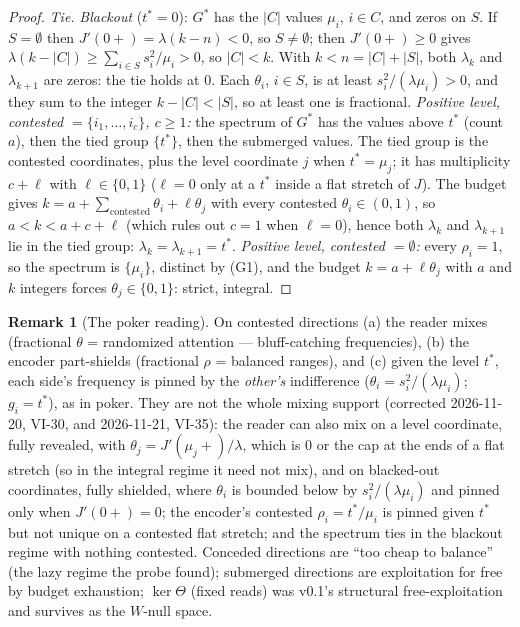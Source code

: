 \documentclass[11pt]{article}
\theoremstyle{definition}
\newtheorem{remark}{Remark}
\begin{document}
\begin{proof}
\emph{Tie.} \emph{Blackout} ($t^\ast=0$): $G^\ast$ has the $|C|$ values
$\mu_i$, $i\in C$, and zeros on $S$. If $S=\emptyset$ then
$J'(0+)=\lambda(k-n)<0$, so $S\neq\emptyset$; then
$J'(0+)\ge0$ gives $\lambda(k-|C|)\ge\sum_{i\in S}s_i^2/\mu_i>0$, so
$|C|<k$. With $k<n=|C|+|S|$, both $\lambda_k$ and $\lambda_{k+1}$ are
zeros: the tie holds at $0$. Each $\theta_i$, $i\in S$, is at least
$s_i^2/(\lambda\mu_i)>0$, and they sum to the integer $k-|C|<|S|$, so at
least one is fractional. \emph{Positive level, contested
$=\{i_1,\dots,i_c\}$, $c\ge1$:} the spectrum of $G^\ast$ has the values
above $t^\ast$ (count $a$), then the tied group $\{t^\ast\}$, then the
submerged values. The tied group is the contested coordinates, plus
the level coordinate $j$ when $t^\ast=\mu_j$; it has multiplicity
$c+\ell$ with $\ell\in\{0,1\}$ ($\ell=0$ only at a $t^\ast$ inside a
flat stretch of $J$). The budget gives $k = a +
\sum_{\text{contested}}\theta_i + \ell\theta_j$ with every contested
$\theta_i\in(0,1)$, so $a < k < a + c + \ell$ (which rules out $c=1$
when $\ell=0$), hence both $\lambda_k$ and $\lambda_{k+1}$ lie in the
tied group: $\lambda_k = \lambda_{k+1} = t^\ast$. \emph{Positive level,
contested $=\emptyset$:} every $\rho_i=1$, so the spectrum is
$\{\mu_i\}$, distinct by (G1), and the budget $k=a+\ell\theta_j$ with
$a$ and $k$ integers forces $\theta_j\in\{0,1\}$: strict, integral.
\end{proof}

\begin{remark}[The poker reading]
On contested directions (a) the reader mixes (fractional $\theta$ =
randomized attention --- bluff-catching frequencies), (b) the encoder
part-shields (fractional $\rho$ = balanced ranges), and (c) given the
level $t^\ast$, each side's frequency is pinned by the \emph{other's}
indifference
($\theta_i = s_i^2/(\lambda\mu_i)$; $g_i = t^\ast$), as in poker. They
are not the whole mixing support (corrected 2026-11-20, VI-30, and
2026-11-21, VI-35): the reader can also mix on a level coordinate, fully
revealed, with $\theta_j=J'(\mu_j+)/\lambda$, which is $0$ or the cap at
the ends of a flat stretch (so in the integral regime it need not mix),
and on blacked-out coordinates, fully shielded, where $\theta_i$ is
bounded below by $s_i^2/(\lambda\mu_i)$ and pinned only when
$J'(0+)=0$; the encoder's contested $\rho_i=t^\ast/\mu_i$ is pinned
given $t^\ast$ but not unique on a contested flat stretch; and the
spectrum ties in the blackout regime with nothing contested. Conceded directions are ``too cheap to balance''
(the lazy regime the probe found); submerged directions are
exploitation for free by budget exhaustion; $\ker\Theta$ (fixed
reads) was v0.1's structural free-exploitation and survives as the
$W$-null space.
\end{remark}
\end{document}
